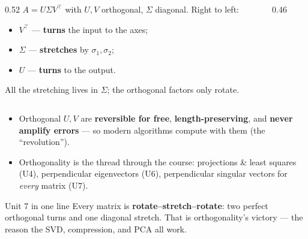 \documentclass[aspectratio=169, 11pt]{beamer}
\newcommand{\xx}{\mathbf{x}}
\newcommand{\T}{^{\top}}
\begin{document}
\begin{frame}[t, plain]
  \begin{columns}[T]
    \begin{column}{0.52\textwidth}
      $A=U\Sigma V\T$ with $U,V$ orthogonal, $\Sigma$ diagonal. Right to left:
      \begin{itemize}
        \setlength{\itemsep}{4pt}
        \item $V\T$ --- \textbf{turns} the input to the axes;
        \item $\Sigma$ --- \textbf{stretches} by $\sigma_1,\sigma_2$;
        \item $U$ --- \textbf{turns} to the output.
      \end{itemize}
      \vspace{4pt}
      All the stretching lives in $\Sigma$; the orthogonal factors only rotate.
    \end{column}
    \begin{column}{0.46\textwidth}
      \centering
    \end{column}
  \end{columns}
\end{frame}

\begin{frame}[t, plain]
  \begin{itemize}
    \setlength{\itemsep}{6pt}
    \item Orthogonal $U,V$ are \textbf{reversible for free}, \textbf{length-preserving}, and \textbf{never
          amplify errors} --- so modern algorithms compute with them (the ``revolution'').
    \item Orthogonality is the thread through the course: projections \& least squares (U4), perpendicular
          eigenvectors (U6), perpendicular singular vectors for \emph{every} matrix (U7).
  \end{itemize}
  \vspace{2pt}
  \begin{block}{Unit 7 in one line}
    Every matrix is \textbf{rotate--stretch--rotate}: two perfect orthogonal turns and one diagonal stretch.
    That is orthogonality's victory --- the reason the SVD, compression, and PCA all work.
  \end{block}
\end{frame}
\end{document}

